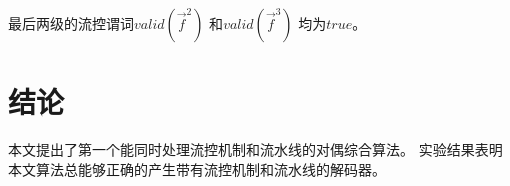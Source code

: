 最后两级的流控谓词$valid(\vec{f}^2)$ 和$valid(\vec{f}^3)$ 均为$true$。






%
%
%
%
%
%
%
%
%
%


\section{结论}\label{sec_conclude}
本文提出了第一个能同时处理流控机制和流水线的对偶综合算法。
实验结果表明本文算法总能够正确的产生带有流控机制和流水线的解码器。

